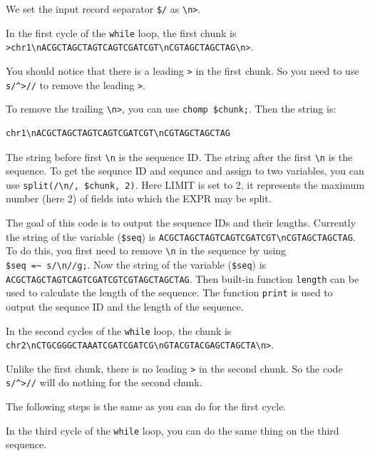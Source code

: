 \documentclass[]{book}
\begin{document}
We set the input record separator \texttt{\$/} as \texttt{\textbackslash{}n\textgreater{}}.

In the first cycle of the \texttt{while} loop, the first chunk is \texttt{\textgreater{}chr1\textbackslash{}nACGCTAGCTAGTCAGTCGATCGT\textbackslash{}nCGTAGCTAGCTAG\textbackslash{}n\textgreater{}}.

You should notice that there is a leading \texttt{\textgreater{}} in the first chunk. So you need to use \texttt{s/\^{}\textgreater{}//} to remove the leading \texttt{\textgreater{}}.

To remove the trailing \texttt{\textbackslash{}n\textgreater{}}, you can use \texttt{chomp\ \$chunk;}. Then the string is:

\begin{verbatim}
chr1\nACGCTAGCTAGTCAGTCGATCGT\nCGTAGCTAGCTAG
\end{verbatim}

The string before first \texttt{\textbackslash{}n} is the sequence ID. The string after the first \texttt{\textbackslash{}n} is the sequence. To get the sequnce ID and sequnce and assign to two variables, you can use \texttt{split(/\textbackslash{}n/,\ \$chunk,\ 2)}. Here LIMIT is set to 2, it represents the maximum number (here 2) of fields into which the EXPR may be split.

The goal of this code is to output the sequence IDs and their lengths. Currently the string of the variable (\texttt{\$seq}) is \texttt{ACGCTAGCTAGTCAGTCGATCGT\textbackslash{}nCGTAGCTAGCTAG}. To do this, you first need to remove \texttt{\textbackslash{}n} in the sequence by using \texttt{\$seq\ =\textasciitilde{}\ s/\textbackslash{}n//g;}. Now the string of the variable (\texttt{\$seq}) is \texttt{ACGCTAGCTAGTCAGTCGATCGTCGTAGCTAGCTAG}. Then built-in function \texttt{length} can be used to calculate the length of the sequence. The function \texttt{print} is used to output the sequnce ID and the length of the sequence.

In the second cycles of the \texttt{while} loop, the chunk is
\texttt{chr2\textbackslash{}nCTGCGGGCTAAATCGATCGATCG\textbackslash{}nGTACGTACGAGCTAGCTA\textbackslash{}n\textgreater{}}.

Unlike the first chunk, there is no leading \texttt{\textgreater{}} in the second chunk. So the code \texttt{s/\^{}\textgreater{}//} will do nothing for the second chunk.

The following steps is the same as you can do for the first cycle.

In the third cycle of the \texttt{while} loop, you can do the same thing on the third sequence.
\end{document}
